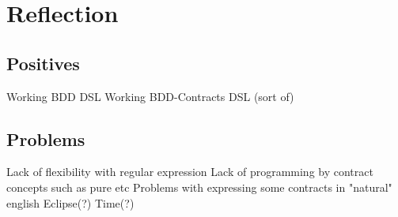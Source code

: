 \section{Reflection}

\subsection{Positives}
Working BDD DSL
Working BDD-Contracts DSL (sort of)


\subsection{Problems}
Lack of flexibility with regular expression
Lack of programming by contract concepts such as pure etc
Problems with expressing some contracts in "natural" english
Eclipse(?)
Time(?)
